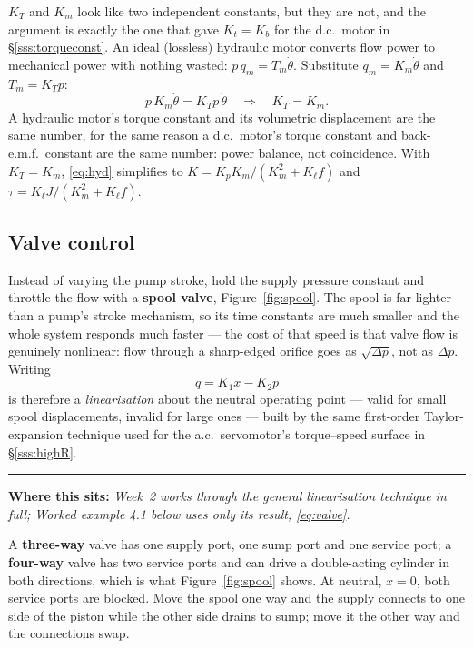 \documentclass[11pt,a4paper]{article}
\newcommand{\statedin}[1]{%
  \par\smallskip\noindent
  \textcolor{fnavy}{\rule{\textwidth}{0.4pt}}\par\vspace{-4pt}
  {\small\textcolor{fnavy}{\textbf{Where this sits:}} \textit{#1}}\par\smallskip}
\begin{document}
\begin{keyidea}
$K_{T}$ and $K_{m}$ look like two independent constants, but they are not, and
the argument is exactly the one that gave $K_{t}=K_{b}$ for the d.c.\ motor in
\S\ref{sss:torqueconst}. An ideal (lossless) hydraulic motor converts flow
power to mechanical power with nothing wasted: $p\,q_{m}=T_{m}\dot\theta$.
Substitute $q_{m}=K_{m}\dot\theta$ and $T_{m}=K_{T}p$:
\[
  p\,K_{m}\dot\theta = K_{T}p\,\dot\theta \quad\Longrightarrow\quad K_{T}=K_{m}.
\]
A hydraulic motor's torque constant and its volumetric displacement are the
same number, for the same reason a d.c.\ motor's torque constant and
back-e.m.f.\ constant are the same number: power balance, not coincidence.
With $K_{T}=K_{m}$, \eqref{eq:hyd} simplifies to
$K=K_{p}K_{m}/(K_{m}^{2}+K_{\ell}f)$ and $\tau=K_{\ell}J/(K_{m}^{2}+K_{\ell}f)$.
\end{keyidea}

\subsection{Valve control}
\label{sec:valve}

Instead of varying the pump stroke, hold the supply pressure constant and
throttle the flow with a \textbf{spool valve}, Figure~\ref{fig:spool}. The
spool is far lighter than a pump's stroke mechanism, so its time constants
are much smaller and the whole system responds much faster --- the cost of
that speed is that valve flow is genuinely nonlinear: flow through a
sharp-edged orifice goes as $\sqrt{\Delta p}$, not as $\Delta p$. Writing
\begin{equation}
  q = K_{1}x - K_{2}p
  \label{eq:valve}
\end{equation}
is therefore a \emph{linearisation} about the neutral operating point ---
valid for small spool displacements, invalid for large ones --- built by the
same first-order Taylor-expansion technique used for the a.c.\ servomotor's
torque--speed surface in \S\ref{sss:highR}.

\statedin{Week~2 works through the general linearisation technique in full;
Worked example 4.1 below uses only its result, \eqref{eq:valve}.}

A \textbf{three-way} valve has one supply port, one sump port and one service
port; a \textbf{four-way} valve has two service ports and can drive a
double-acting cylinder in both directions, which is what
Figure~\ref{fig:spool} shows. At neutral, $x=0$, both service ports are
blocked. Move the spool one way and the supply connects to one side of the
piston while the other side drains to sump; move it the other way and the
connections swap.
\end{document}
